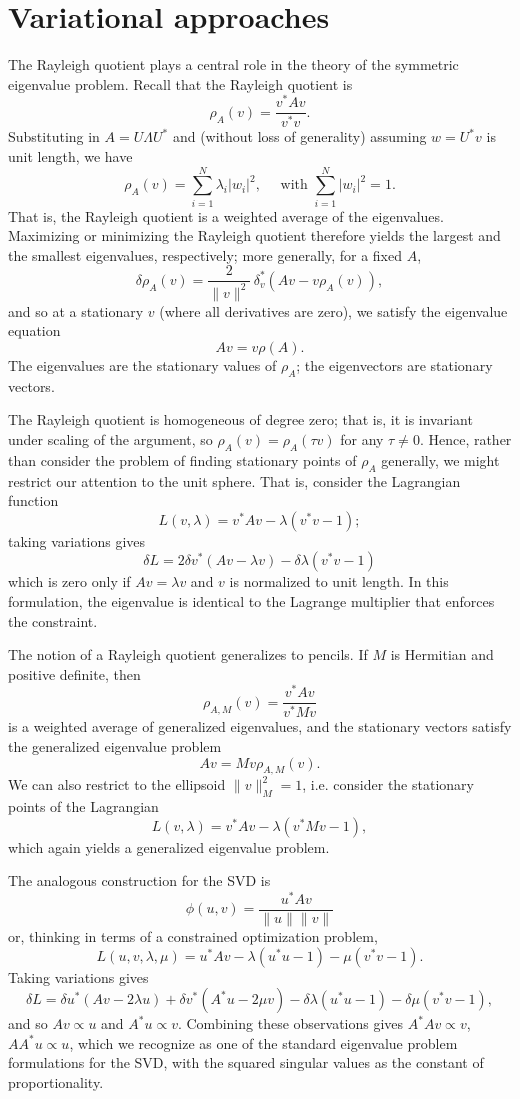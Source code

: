 \section{Variational approaches}


The Rayleigh quotient plays a central role in the theory of the
symmetric eigenvalue problem.  Recall that the Rayleigh quotient is
\[
  \rho_A(v) = \frac{v^* A v}{v^* v}.
\]
Substituting in $A = U \Lambda U^*$ and (without loss of generality)
assuming $w = U^* v$ is unit length, we have
\[
  \rho_A(v) = \sum_{i=1}^N \lambda_i |w_i|^2, \quad
  \mbox{ with } \sum_{i=1}^N |w_i|^2 = 1.
\]
That is, the Rayleigh quotient is a weighted average of the eigenvalues.
Maximizing or minimizing the Rayleigh quotient therefore yields the
largest and the smallest eigenvalues, respectively; more generally,
for a fixed $A$,
\[
  \delta \rho_A(v) = \frac{2}{\|v\|^2} \, \delta_v^* \left( A v - v \rho_A(v) \right),
\]
and so at a stationary $v$ (where all derivatives are zero),
we satisfy the eigenvalue equation
\[
  Av = v \rho(A).
\]
The eigenvalues are the stationary values of $\rho_A$; the eigenvectors
are stationary vectors.

The Rayleigh quotient is homogeneous of degree zero; that is, it is
invariant under scaling of the argument, so $\rho_A(v) = \rho_A(\tau v)$
for any $\tau \neq 0$.  Hence, rather than consider the problem of
finding stationary points of $\rho_A$ generally, we might restrict our
attention to the unit sphere.  That is, consider the Lagrangian function
\[
  L(v,\lambda) = v^* A v - \lambda (v^* v - 1);
\]
taking variations gives
\[
  \delta L = 2 \delta v^* (Av -\lambda v) - \delta \lambda (v^* v - 1)
\]
which is zero only if $Av = \lambda v$ and $v$ is normalized to unit
length.  In this formulation, the eigenvalue is identical to the
Lagrange multiplier that enforces the constraint.

The notion of a Rayleigh quotient generalizes to pencils.
If $M$ is Hermitian and positive definite, then
\[
  \rho_{A,M}(v) = \frac{v^* A v}{v^* M v}
\]
is a weighted average of generalized eigenvalues, and the stationary
vectors satisfy the generalized eigenvalue problem
\[
  Av = Mv \rho_{A,M}(v).
\]
We can also restrict to the ellipsoid $\|v\|_M^2 = 1$, i.e. consider
the stationary points of the Lagrangian
\[
  L(v,\lambda) = v^* A v - \lambda (v^* M v - 1),
\]
which again yields a generalized eigenvalue problem.

The analogous construction for the SVD is
\[
  \phi(u,v) = \frac{u^* A v}{\|u\| \|v\|}
\]
or, thinking in terms of a constrained optimization problem, 
\[
  L(u,v,\lambda,\mu) = u^* A v - \lambda (u^* u - 1) - \mu (v^* v-1).
\]
Taking variations gives
\[
  \delta L =
  \delta u^* (Av - 2\lambda u) + \delta v^* (A^* u-2\mu v) - \delta \lambda (u^*u - 1) - \delta \mu (v^* v - 1),
\]
and so $Av \propto u$ and $A^* u \propto v$.  Combining these observations
gives $A^* A v \propto v$, $A A^* u \propto u$, which we recognize as one
of the standard eigenvalue problem formulations for the SVD, with the squared
singular values as the constant of proportionality.
